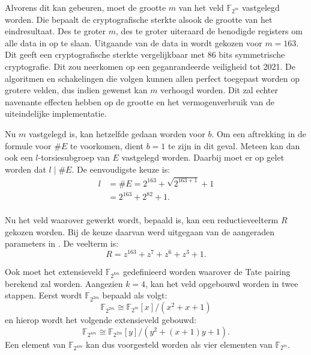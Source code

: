 Alvorens dit kan gebeuren, moet de grootte $m$ van het veld $\mathbb{F}_{2^m}$ vastgelegd worden. Die bepaalt de cryptografische sterkte alsook de grootte van het eindresultaat. Des te groter $m$, des te groter uiteraard de benodigde registers om alle data in op te slaan. Uitgaande van de data in \cite{lenstra} wordt gekozen voor $m = 163$. Dit geeft een cryptografische sterkte vergelijkbaar met 86 bits symmetrische cryptografie. Dit zou neerkomen op een geganrandeerde veiligheid tot 2021. De algoritmen en schakelingen die volgen kunnen allen perfect toegepast worden op grotere velden, dus indien gewenst kan $m$ verhoogd worden. Dit zal echter navenante effecten hebben op de grootte en het vermogenverbruik van de uiteindelijke implementatie.

Nu $m$ vastgelegd is, kan hetzelfde gedaan worden voor $b$. Om een aftrekking in de formule voor $\#E$ te voorkomen, dient $b = 1$ te zijn in dit geval. Meteen kan dan ook een $l$-torsiesubgroep van $E$ vastgelegd worden. Daarbij moet er op gelet worden dat $l \mid \#E$. De eenvoudigste keuze is:
\[\begin{aligned}
l	&= \#E = 2^{163} + \sqrt{2^{163 + 1}} + 1\\
	&= 2^{163} + 2^{82} + 1.\\
\end{aligned}\]

Nu het veld waarover gewerkt wordt, bepaald is, kan een reductieveelterm $R$ gekozen worden. Bij de keuze daarvan werd uitgegaan van de aangeraden parameters in \cite{sec2}. De veelterm is:
\[R = z^{163} + z^7 + z^6 + z^3 + 1.\]

Ook moet het extensieveld $\mathbb{F}_{2^{k m}}$ gedefinieerd worden waarover de Tate pairing berekend zal worden. Aangezien $k = 4$, kan het veld opgebouwd worden in twee stappen. Eerst wordt $\mathbb{F}_{2^{2m}}$ bepaald als volgt:
\[\mathbb{F}_{2^{2m}} \cong \mathbb{F}_{2^m}[x]/(x^2 + x + 1)\]
en hierop wordt het volgende extensieveld gebouwd:
\[\mathbb{F}_{2^{4m}} \cong \mathbb{F}_{2^{2m}}[y]/(y^2 + (x + 1)y + 1).\]
Een element van $\mathbb{F}_{2^{4m}}$ kan dus voorgesteld worden als vier elementen van $\mathbb{F}_{2^m}$.

